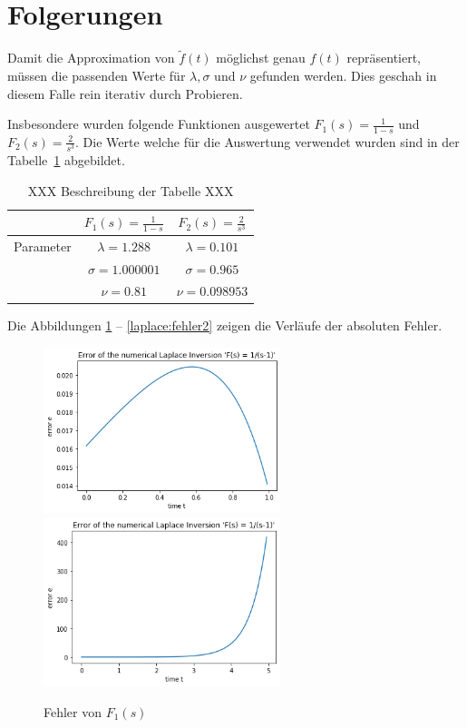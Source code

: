 %
%
%

\section{Folgerungen
\label{laplace:section:folgerungen}}
Damit die Approximation von $\tilde{f}(t)$ möglichst genau $f(t)$ repräsentiert,
müssen die passenden Werte für $\lambda, \sigma $ und $\nu $ gefunden werden. 
Dies geschah in diesem Falle rein iterativ durch Probieren.

Insbesondere wurden folgende Funktionen ausgewertet $ F_{1}(s)=\frac{1}{1-s} $ und $F_{2}(s) = \frac{2}{s^{3}}$. 
Die Werte welche für die Auswertung verwendet wurden sind in der Tabelle~\ref{laplace:parametertabelle} abgebildet.

\begin{table}
\centering
\begin{tabular}[c]{c|c|c}
& $F_{1}(s)=\frac{1}{1-s}$ & $F_{2}(s) = \frac{2}{s^{3}}$ \\
\hline
Parameter & $\lambda=1.288$ & $\lambda=0.101$ \\
& $\sigma=1.000001$ & $\sigma=0.965$ \\
& $\nu=0.81$ & $\nu=0.098953$ \\
\end{tabular}
\caption{XXX Beschreibung der Tabelle XXX
\label{laplace:parametertabelle}}
\end{table}
Die Abbildungen \ref{laplace:fehlerf1} -- \ref{laplace:fehler2} zeigen die Verläufe der absoluten Fehler.

\begin{figure}
\centering
\includegraphics[width=6.9cm]{papers/laplace/Error_1divide_sminus1}
\includegraphics[width=6.9cm]{papers/laplace/Error_1divide_sminus1_bis_tgleich5}
\caption{Fehler von $F_{1}(s)$
\label{laplace:fehlerf1}
}
\end{figure}

